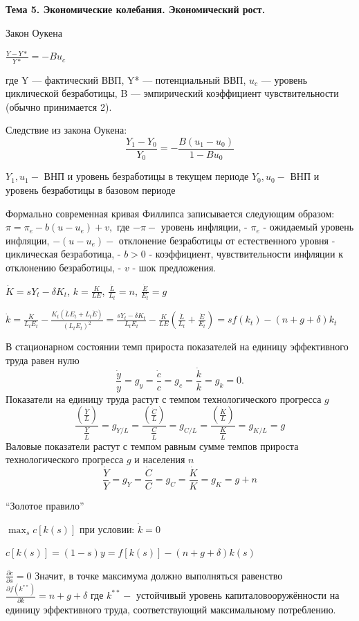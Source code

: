 \documentclass[a4paper,8pt]{article} %
\begin{document}
\textbf{Тема 5. Экономические колебания. Экономический
рост.}

Закон Оукена \textsf{}

$\frac{Y-Y *}{Y *}=-B u_{c}$

где Y — фактический ВВП, Y* — потенциальный ВВП, $u_c$ — уровень циклической безработицы, B — эмпирический коэффициент чувствительности (обычно принимается 2). 

Следствие из закона Оукена:
$$
\frac{Y_{1}-Y_{0}}{Y_{0}}=-\frac{B\left(u_{1}-u_{0}\right)}{1-B u_{0}}
$$

$Y_{1}, u_{1}-$ ВНП и уровень безработицы в текущем периоде
$Y_{0}, u_{0}-$ ВНП и уровень безработицы в базовом периоде

Формально современная кривая Филлипса записывается следующим образом: $\pi=\pi_{e}-b\left(u-u_{e}\right)+v,$ где
$-\pi-$ уровень инфляции,
- $\pi_{e}$ - ожидаемый уровень инфляции,
$-\left(u-u_{e}\right)-$ отклонение безработицы от естественного уровня - циклическая безработица,
- $b>0$ - коэффициент, чувствительности инфляции к отклонению безработицы,
- $v$ - шок предложения.


$\dot{K}=s Y_{t}-\delta K_{t}$, $k=\frac{K}{L E}$, $\frac{\dot{L}}{L_{t}}=n$, $\frac{\dot{E}}{E_{t}}=g$


$\dot{k}=\frac{\dot{K}}{L_{t} E_{t}}-\frac{K_{t}\left(\dot{L} E_{t}+L_{t} \dot{E}\right)}{\left(L_{t} E_{t}\right)^{2}}=\frac{s Y_{t}-\delta K_{t}}{L_{t} E_{t}}-\frac{K}{L E}\left(\frac{\dot{L}}{L_{t}}+\frac{\dot{E}}{E_{t}}\right)=s f\left(k_{t}\right)-(n+g+\delta) k_{t}$

В стационарном состоянии темп прироста показателей на единицу эффективного труда равен нулю
$$
\frac{\dot{y}}{y}=g_{y}=\frac{\dot{c}}{c}=g_{c}=\frac{\dot{k}}{k}=g_{k}=0 .
$$
Показатели на единицу труда растут с темпом технологического прогресса $g$
$$
\frac{\left(\frac{\dot{Y}}{L}\right)}{\frac{Y}{L}}=g_{Y / L}=\frac{\left(\frac{\dot{C}}{L}\right)}{\frac{C}{L}}=g_{C / L}=\frac{\left(\frac{\dot{K}}{L}\right)}{\frac{K}{L}}=g_{K / L}=g
$$
Валовые показатели растут с темпом равным сумме темпов прироста технологического прогресса $g$ и населения $n$
$$
\frac{\dot{Y}}{Y}=g_{Y}=\frac{\dot{C}}{C}=g_{C}=\frac{\dot{K}}{K}=g_{K}=g+n
$$

``Золотое правило''

$\max _{s} c[k(s)]$ при условии:
$
\dot{k}=0
$


$c[k(s)]=(1-s) y=f[k(s)]-(n+g+\delta) k(s)$

$\frac{\partial c}{\partial s}=0$
Значит, в точке максимума должно выполняться равенство
 $\frac{\partial f\left(k^{* *}\right)}{\partial k}=n+g+\delta$
где $k^{* *}-$ устойчивый уровень капиталовооружённости на единицу эффективного труда, соответствующий максимальному потреблению.
\end{document}
